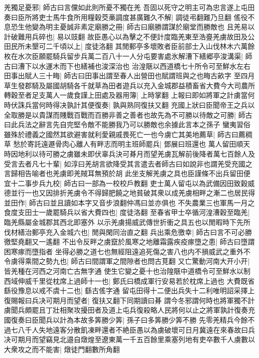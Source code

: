 羌獨足憂邪|{
	師古曰言儻如此則所憂不獨在羌}
吾固以死守之明主可為忠言遂上屯田奏曰臣所將吏士馬牛食所用糧穀茭槀調度甚廣難久不解|{
	調徒弔翻難乃旦翻}
傜役不息恐生他變為明主憂誠非素定廟勝之冊|{
	師古曰廟勝謂謀於廟堂而勝敵也}
且羌易以計破難用兵碎也|{
	易以豉翻}
故臣愚心以為擊之不便計度臨羌東至浩亹羌虜故田及公田民所未墾可二千頃以上|{
	度徒洛翻}
其閒郵亭多壞敗者臣前部士入山伐林木六萬餘枚在水次臣願罷騎兵留步兵萬二百八十一人分屯要害處氷解漕下繕郷亭浚溝渠|{
	師古曰漕下以水運木而下也繕補也浚深治也}
治湟陿以西道橋七十所令可至鮮水左右田事出賦人三十畮|{
	師古曰田事出謂至春人出營田也賦謂班與之也畮古畝字}
至四月草生發郡騎及屬國胡騎各千就草為田者遊兵以充入金城郡益積畜省大費今大司農所轉穀至者足支萬人一歲食謹上田處及器用簿|{
	上時掌翻}
上報曰即如將軍之計虜當何時伏誅兵當何時得决孰計其便復奏|{
	孰與熟同復扶又翻}
充國上狀曰臣聞帝王之兵以全取勝是以貴謀而賤戰百戰而百勝非善之善者也故先為不可勝以待敵之可勝|{
	師古曰此兵法之辭言先自完堅令敵不能勝我乃可以勝敵也余據此言本之孫子}
蠻夷習俗雖殊於禮義之國然其欲避害就利愛親戚畏死亡一也今虜亡其美地薦草|{
	師古曰薦稠草}
愁於寄託遠遯骨肉心離人有畔志而明主班師罷兵|{
	鄧展曰班還也}
萬人留田順天時因地利以待可勝之虜雖未即伏辜兵決可朞月而望羌虜瓦解前後降者萬七百餘人及受言去者凡七十輩|{
	如淳曰羌胡言欲降受其言遣去者師古曰如說非也謂羌受充國之言歸相告喻者也羌虜即羌賊耳無預於胡}
此坐支解羌虜之具也臣謹條不出兵留田便宜十二事步兵九校|{
	師古曰一部為一校校戶教翻}
吏士萬人留屯以為武備因田致穀威德並行一也又因排折羌虜令不得歸肥饒之地貧破其衆以成羌虜相畔之漸二也居民得並田作|{
	師古曰並且讀如本字又音步浪翻仲馮曰並亦俱也}
不失農業三也軍馬一月之食度支田士一歲罷騎兵以省大費四也|{
	度徒洛翻}
至春省甲士卒循河湟漕穀至臨羌|{
	臨羌縣屬金城郡其西北即塞外}
以示羌虜揚威武傳世折衝之具五也以閒暇時下先所伐材繕治郵亭充入金城六也|{
	閒與閑同治直之翻}
兵出乘危徼幸|{
	師古曰言不可必勝徼堅堯翻又一遙翻}
不出令反畔之虜竄於風寒之地離霜露疾疫瘃墮之患|{
	師古曰墮謂困寒瘃而墮指者}
坐得必勝之道七也無經阻遠追死傷之害八也内不損威武之重外不令虜得乘間之勢九也|{
	師古曰間謂軍之間隙者也問古莧翻}
又亡驚動河南大开小开|{
	皆羌種在河西之河南亡古無字通}
使生它變之憂十也治隍陿中道橋令可至鮮水以制西域伸威千里從枕席上過師十一也|{
	鄭氏曰橋成軍行安易若於枕席上過也}
大費既省繇役豫息以戒不虞十二也|{
	繇古傜字通}
留屯田得十二便出兵失十二利唯明詔采擇上復賜報曰兵决可期月而望者|{
	復扶又翻下同期讀曰朞}
謂今冬邪謂何時也將軍獨不計虜聞兵頗罷且丁壯相聚攻擾田者及道上屯兵復殺略人民將何以止之將軍孰計復奏充國復奏曰臣聞兵以計為本故多筭勝少筭|{
	孫子曰多筭勝少筭不勝}
先零羌精兵今餘不過七八千人失地遠客分散飢凍畔還者不絶臣愚以為虜破壞可日月冀遠在來春故曰兵决可期月而望竊見北邉自燉煌至遼東萬一千五百餘里乘塞列地有吏卒數千人虜數以大衆攻之而不能害|{
	燉徒門翻數所角翻}
